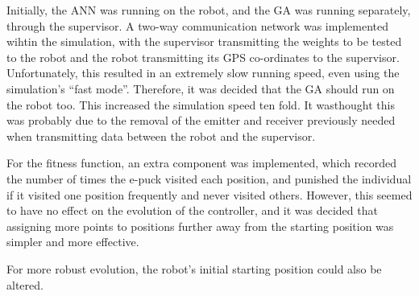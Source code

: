 Initially, the ANN was running on the robot, and the GA was running separately, through the supervisor. A two-way communication network was implemented wihtin the simulation, with the supervisor transmitting the weights to be tested to the robot and the robot transmitting its GPS co-ordinates to the supervisor. Unfortunately, this resulted in an extremely slow running speed, even using the simulation's ``fast mode''. Therefore, it was decided that the GA should run on the robot too. This increased the simulation speed ten fold. It wasthought this was probably due to the removal of the emitter and receiver previously needed when transmitting data between the robot and the supervisor.
 
For the fitness function, an extra component was implemented, which recorded the number of times the e-puck visited each position, and punished the individual if it visited one position frequently and never visited others. However, this seemed to have no effect on the evolution of the controller, and it was decided that assigning more points to positions further away from the starting position was simpler and more effective.

For more robust evolution, the robot's initial starting position could also be altered.

